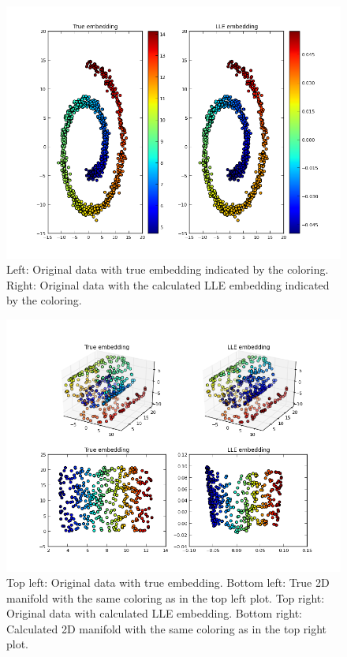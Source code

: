 \documentclass[a4paper, 12pt, titlepage]{article}
\begin{document}
\begin{figure}[H]
	\centering
	\includegraphics[width=17cm]{images/flatroll.png}
	\caption{Left: Original data with true embedding indicated by the coloring. 
	Right: Original data with the calculated LLE embedding indicated by the coloring.}
\end{figure}

\begin{figure}[H]
	\centering
	\includegraphics[width=17cm]{images/swissroll.png}
	\caption{Top left: Original data with true embedding.
	Bottom left: True 2D manifold with the same coloring as in the top left plot.
	Top right: Original data with calculated LLE embedding.
	Bottom right: Calculated 2D manifold with the same coloring as in the top right plot.}
\end{figure}
\end{document}
